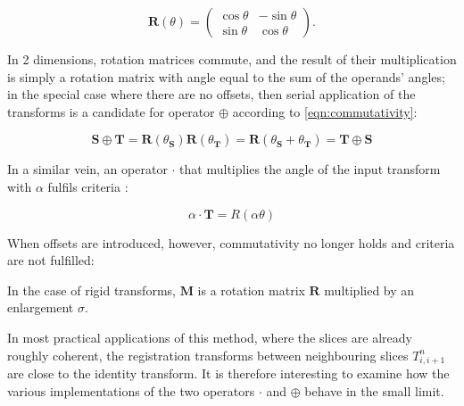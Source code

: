 		\begin{equation}
			\mathbf{R}(\theta) = \left( \begin{matrix}
			  										 \cos \theta & -\sin\theta \\
														 \sin\theta & \cos\theta
					                 \end{matrix} \right) .
		\end{equation}
		
		In 2 dimensions, rotation matrices commute, and the result of their multiplication is simply a rotation matrix with angle equal to the sum of the operands' angles; in the special case where there are no offsets, then serial application of the transforms is a candidate for operator $\oplus$ according to \ref{eqn:commutativity}:
		
		\begin{equation}
			\mathbf{S} \oplus \mathbf{T} = \mathbf{R}(\theta_\mathbf{S})\mathbf{R}(\theta_\mathbf{T}) = \mathbf{R}(\theta_\mathbf{S} + \theta_\mathbf{T}) = \mathbf{T} \oplus \mathbf{S}
		\end{equation}
		
		
		In a similar vein, an operator $\cdot$ that multiplies the angle of the input transform with $\alpha$ fulfils criteria :
    
    \begin{equation}
      \alpha \cdot \mathbf{T} = R(\alpha\theta)
    \end{equation}
		
		When offsets are introduced, however, commutativity no longer holds and criteria  are not fulfilled:
		
		
		In the case of rigid transforms, $\mathbf{M}$ is a rotation matrix $\mathbf{R}$ multiplied by an enlargement $\sigma$. 
		
		In most practical applications of this method, where the slices are already roughly coherent, the registration transforms between neighbouring slices $T_{i,i+1}^n$ are close to the identity transform. It is therefore interesting to examine how the various implementations of the two operators $\cdot$ and $\oplus$ behave in the small limit.
	
	
